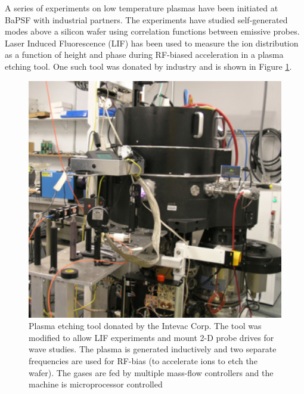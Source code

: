 \documentclass[11pt]{article}
\begin{document}
A series of experiments on low temperature plasmas have been initiated at BaPSF with industrial partners.  The experiments have studied self-generated modes above a silicon wafer using correlation functions between emissive probes.  Laser Induced Fluorescence (LIF) has been used to measure the ion distribution as a function of height and phase during RF-biased acceleration in a plasma etching tool.  One such tool was donated by industry and is shown in Figure \ref{fig:etchtool}.
\begin{figure}[htbp]
\centering
  \begin{minipage}[c]{0.5\textwidth}
    \includegraphics[width=\textwidth]{etchtool.jpg}
  \end{minipage}\hfill
  \begin{minipage}[c]{0.4\textwidth}
    \caption{\small Plasma etching tool donated by the Intevac Corp.  The tool was modified to allow LIF experiments and mount 2-D probe drives for wave studies.  The plasma is generated inductively and two separate frequencies are used for RF-bias (to accelerate ions to etch the wafer). The gases are fed by multiple mass-flow controllers and the machine is microprocessor controlled} 
    \label{fig:etchtool}
  \end{minipage}
\end{figure}
\end{document}
